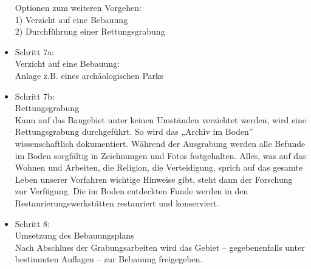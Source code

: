 \documentclass[fleqn,twoside,dvipsnames]{article}
\begin{document}
\begin{itemize}
            Optionen zum weiteren Vorgehen:\\
            1) Verzicht auf eine
            Bebauung\\
            2) Durchführung einer
            Rettungsgrabung
            \item Schritt 7a:\\ Verzicht auf eine Bebauung:\\
            Anlage z.B. eines archäologischen Parks
            \item Schritt 7b:\\ Rettungsgrabung\\
            Kann auf das Baugebiet unter keinen Umständen
            verzichtet werden, wird eine Rettungsgrabung
            durchgeführt. So wird das „Archiv im Boden”
            wissenschaftlich dokumentiert.
            Während der Ausgrabung werden alle Befunde im Boden
            sorgfältig in Zeichnungen und Fotos festgehalten. Alles,
            was auf das Wohnen und Arbeiten, die Religion, die
            Verteidigung, sprich auf das
            gesamte Leben unserer
            Vorfahren wichtige Hinweise
            gibt, steht dann der Forschung
            zur Verfügung.
            Die im Boden entdeckten Funde werden in den
            Restaurierungswerkstätten restauriert und konserviert.
            \item Schritt 8:\\ Umsetzung des Bebauungsplans\\
            Nach Abschluss der Grabungsarbeiten wird das Gebiet –
            gegebenenfalls unter bestimmten Auflagen – zur
            Bebauung freigegeben.
        \end{itemize}

    
\end{document}
